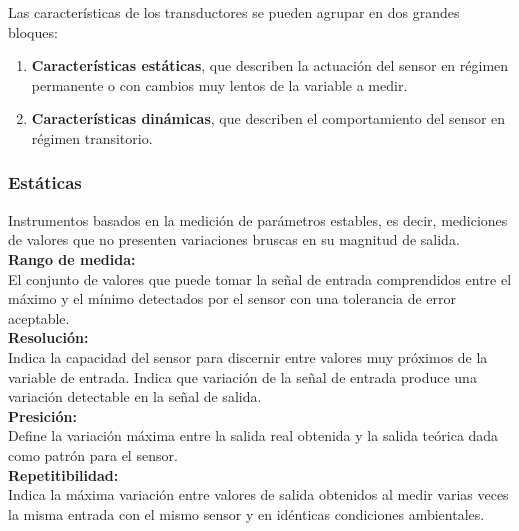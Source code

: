 Las características de los transductores se pueden agrupar en dos grandes bloques:\\

\begin{enumerate}
 \item \textbf{Características estáticas}, que describen la actuación del sensor en régimen permanente o 
con cambios muy lentos de la variable a medir. \\
 \item \textbf{Características dinámicas}, que describen el comportamiento del sensor en régimen transitorio.\\
\end{enumerate}

\subsubsection{Estáticas}

Instrumentos basados en la medición de parámetros estables, es decir, mediciones de valores que no presenten variaciones bruscas en su magnitud de salida.\\

\textbf{Rango de medida:}\\

El  conjunto  de  valores  que  puede  tomar  la  señal  de  entrada comprendidos  entre  el  máximo  y  el  mínimo  detectados  por  el  sensor  con  una  tolerancia 
de error aceptable. \\

\textbf{Resolución:} \\

Indica la capacidad del sensor para discernir entre valores muy próximos de la variable de entrada. Indica que variación de la señal de entrada produce una variación detectable en la señal de salida. \\

\textbf{Presición:}\\

Define la variación  máxima entre la salida real obtenida y la salida teórica dada como patrón para el sensor. \\

\textbf{Repetitibilidad:}\\

Indica la  máxima  variación  entre  valores  de  salida  obtenidos al  medir varias veces la misma entrada con el mismo sensor y en idénticas condiciones 
ambientales.\\


